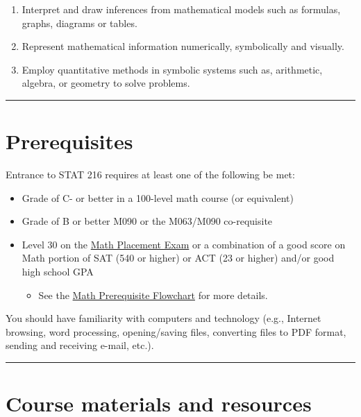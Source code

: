 \documentclass[
]{article}
\providecommand{\tightlist}{%
  \setlength{\itemsep}{0pt}\setlength{\parskip}{0pt}}
\begin{document}
\begin{enumerate}
\def\labelenumi{\arabic{enumi}.}
\tightlist
\item
  Interpret and draw inferences from mathematical models such as
  formulas, graphs, diagrams or tables.
\item
  Represent mathematical information numerically, symbolically and
  visually.
\item
  Employ quantitative methods in symbolic systems such as, arithmetic,
  algebra, or geometry to solve problems.
\end{enumerate}

\begin{center}\rule{0.5\linewidth}{0.5pt}\end{center}

\section{Prerequisites}\label{prerequisites}

Entrance to STAT 216 requires at least one of the following be met:

\begin{itemize}
\tightlist
\item
  Grade of C- or better in a 100-level math course (or equivalent)
\item
  Grade of B or better M090 or the M063/M090 co-requisite
\item
  Level 30 on the \href{http://www.montana.edu/testing/MPLEX.html}{Math
  Placement Exam} or a combination of a good score on Math portion of
  SAT (540 or higher) or ACT (23 or higher) and/or good high school GPA

  \begin{itemize}
  \tightlist
  \item
    See the
    \href{http://www.math.montana.edu/undergrad/documents/MHiearchyFlowchart.pdf}{Math
    Prerequisite Flowchart} for more details.
  \end{itemize}
\end{itemize}

You should have familiarity with computers and technology (e.g.,
Internet browsing, word processing, opening/saving files, converting
files to PDF format, sending and receiving e-mail, etc.).

\begin{center}\rule{0.5\linewidth}{0.5pt}\end{center}

\section{Course materials and
resources}\label{course-materials-and-resources}
\end{document}
